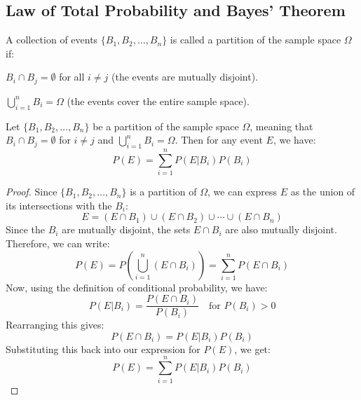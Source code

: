 \subsection{Law of Total Probability and Bayes' Theorem}
\begin{definition}
    A collection of events $\{B_1, B_2, \ldots, B_n\}$ is called a partition of the sample space $\Omega$ if:
    \begin{citemize}
        \item $B_i \cap B_j = \emptyset$ for all $i \neq j$ (the events are mutually disjoint).
        \item $\bigcup_{i=1}^n B_i = \Omega$ (the events cover the entire sample space).
    \end{citemize}
\end{definition}

\begin{theorem}
    Let $\{B_1, B_2, \ldots, B_n\}$ be a partition of the sample space $\Omega$, meaning that $B_i \cap B_j = \emptyset$ for $i \neq j$ and $\bigcup_{i=1}^n B_i = \Omega$. Then for any event $E$, we have:
    \[
        P(E) = \sum_{i=1}^n P(E|B_i)P(B_i)
    \]
\end{theorem}
\begin{proof}
    Since $\{B_1, B_2, \ldots, B_n\}$ is a partition of $\Omega$, we can express $E$ as the union of its intersections with the $B_i$:
    \[
        E = (E \cap B_1) \cup (E \cap B_2) \cup \cdots \cup (E \cap B_n)
    \]
    Since the $B_i$ are mutually disjoint, the sets $E \cap B_i$ are also mutually disjoint. Therefore, we can write:
    \[
        P(E) = P\left( \bigcup_{i=1}^n (E \cap B_i) \right) = \sum_{i=1}^n P(E \cap B_i)
    \]
    Now, using the definition of conditional probability, we have:
    \[
        P(E|B_i) = \frac{P(E \cap B_i)}{P(B_i)} \quad \text{for } P(B_i) > 0
    \]
    Rearranging this gives:
    \[
        P(E \cap B_i) = P(E|B_i)P(B_i)
    \]
    Substituting this back into our expression for $P(E)$, we get:
    \[
        P(E) = \sum_{i=1}^n P(E|B_i)P(B_i)
    \]
\end{proof}

